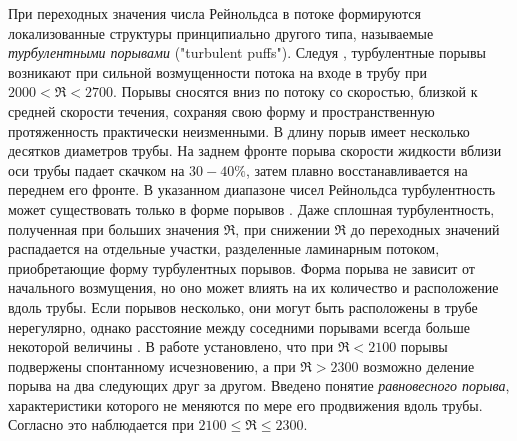 При переходных значения числа Рейнольдса в потоке формируются локализованные структуры принципиально другого типа, называемые {\it турбулентными порывами} ("turbulent puffs"). Следуя \cite{Wygnanski1973}, турбулентные порывы возникают при сильной возмущенности потока на входе в трубу при $2000<\Re<2700$. Порывы сносятся вниз по потоку со скоростью, близкой к средней скорости течения, сохраняя свою форму и пространственную протяженность практически неизменными. В длину порыв имеет несколько десятков диаметров трубы. На заднем фронте порыва скорости жидкости вблизи оси трубы падает скачком на $30-40\%$, затем плавно восстанавливается на переднем его фронте. В указанном диапазоне чисел Рейнольдса турбулентность может существовать только в форме порывов \cite{vanDoorne2009, Moxey2010, Samanta2011}. Даже сплошная турбулентность, полученная при больших значения $\Re$, при снижении $\Re$ до переходных значений распадается на отдельные участки, разделенные ламинарным потоком, приобретающие форму турбулентных порывов. Форма порыва не зависит от начального возмущения, но оно может влиять на их количество и расположение вдоль трубы. Если порывов несколько, они могут быть расположены в трубе нерегулярно, однако расстояние между соседними порывами всегда больше некоторой величины \cite{Samanta2011}. В работе \cite{Wygnanski1975} установлено, что при $\Re<2100$ порывы подвержены спонтанному исчезновению, а при $\Re>2300$ возможно деление порыва на два следующих друг за другом. Введено понятие {\it равновесного порыва}, характеристики которого не меняются по мере его продвижения вдоль трубы. Согласно \cite{Wygnanski1975} это наблюдается при $2100\leqslant \Re \leqslant 2300$. 

